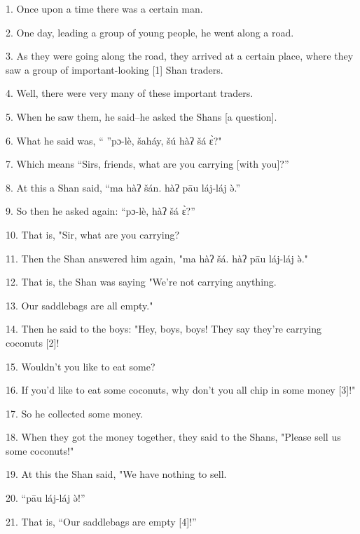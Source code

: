\setcounter{footnote}{0}

1. Once upon a time there was a certain man.

2. One day, leading a group of young people, he went along a road.

3. As they were going along the road, they arrived at a certain place, where they
saw a group of important-looking [1] Shan traders.

4. Well, there were very many of these important traders.

5. When he saw them, he said--he asked the Shans [a question].

6. What he said was, `` ''pɔ-lè, šaháy, šú hàʔ šá ɛ̀?"

7. Which means ``Sirs, friends, what are you carrying [with you]?''

8. At this a Shan said, ``ma hàʔ šán. hàʔ pāu láj-láj ə̀.''

9. So then he asked again: ``pɔ-lè, hàʔ šá ɛ̀?''

10. That is, "Sir, what are you carrying?

11. Then the Shan answered him again, "ma hàʔ šá. hàʔ pāu láj-láj
ə̀."

12. That is, the Shan was saying "We're not carrying anything.

13. Our saddlebags are all empty."

14. Then he said to the boys: "Hey, boys, boys! They say they're carrying
coconuts [2]!

15. Wouldn't you like to eat some?

16. If you'd like to eat some coconuts, why don't you all chip in some money [3]!"

17. So he collected some money.

18. When they got the money together, they said to the Shans, "Please sell
us some coconuts!"

19. At this the Shan said, "We have nothing to sell.

20. ``pāu láj-láj ə̀!''

21. That is, ``Our saddlebags are empty [4]!''

